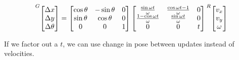 \begin{equation*}
  \prescript{G}{}{\begin{bmatrix}
    \Delta x \\
    \Delta y \\
    \Delta \theta
  \end{bmatrix}} =
  \begin{bmatrix}
    \cos\theta & -\sin\theta & 0 \\
    \sin\theta &  \cos\theta & 0 \\
             0 &           0 & 1
  \end{bmatrix}
  \begin{bmatrix}
    \frac{\sin\omega t}{\omega} & \frac{\cos\omega t - 1}{\omega} & 0 \\
    \frac{1 - \cos\omega t}{\omega} & \frac{\sin\omega t}{\omega} & 0 \\
    0 & 0 & t
  \end{bmatrix}
  \prescript{R}{}{\begin{bmatrix}
    v_x \\
    v_y \\
    \omega
  \end{bmatrix}}
\end{equation*}

If we factor out a $t$, we can use change in pose between updates instead of
velocities.

